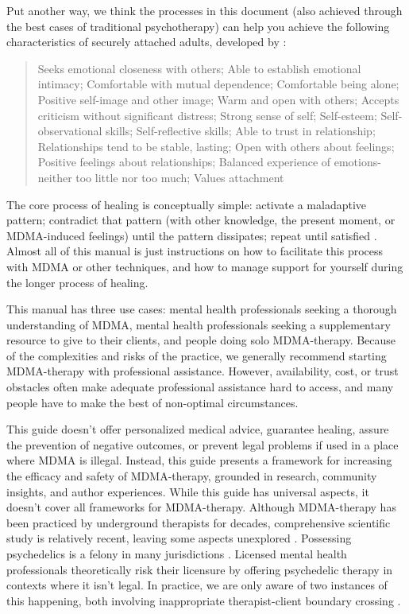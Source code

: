 \documentclass[12pt,letterpaper]{book}
\begin{document}
Put another way, we think the processes in this document (also achieved through the best cases of traditional psychotherapy) can help you achieve the following characteristics of securely attached adults, developed by \textcite{brownAttachmentDisturbances}:
\begin{quotation}
Seeks emotional closeness with others; Able to establish emotional intimacy; Comfortable with mutual dependence; Comfortable being alone; Positive self-image and other image; Warm and open with others; Accepts criticism without significant distress; Strong sense of self; Self-esteem; Self-observational skills; Self-reflective skills; Able to trust in relationship; Relationships tend to be stable, lasting; Open with others about feelings; Positive feelings about relationships; Balanced experience of emotions-neither too little nor too much; Values attachment
\end{quotation}

The core process of healing is conceptually simple: activate a maladaptive pattern; contradict that pattern (with other knowledge, the present moment, or MDMA-induced feelings) until the pattern dissipates; repeat until satisfied \cite{eckerUnlocking}. Almost all of this manual is just instructions on how to facilitate this process with MDMA or other techniques, and how to manage support for yourself during the longer process of healing.

This manual has three use cases: mental health professionals seeking a thorough understanding of MDMA, mental health professionals seeking a supplementary resource to give to their clients, and people doing solo MDMA-therapy. Because of the complexities and risks of the practice, we generally recommend starting MDMA-therapy with professional assistance. However, availability, cost, or trust obstacles often make adequate professional assistance hard to access, and many people have to make the best of non-optimal circumstances.

This guide doesn't offer personalized medical advice, guarantee healing, assure the prevention of negative outcomes, or prevent legal problems if used in a place where MDMA is illegal. Instead, this guide presents a framework for increasing the efficacy and safety of MDMA-therapy, grounded in research, community insights, and author experiences. While this guide has universal aspects, it doesn't cover all frameworks for MDMA-therapy. Although MDMA-therapy has been practiced by underground therapists for decades, comprehensive scientific study is relatively recent, leaving some aspects unexplored \cite{passieHistory}. Possessing psychedelics is a felony in many jurisdictions \cite{alphaLegalization}. Licensed mental health professionals theoretically risk their licensure by offering psychedelic therapy in contexts where it isn't legal. In practice, we are only aware of two instances of this happening, both involving inappropriate therapist-client boundary crossing \cite{sessa2015underground,lindsayLicense}.
\end{document}
